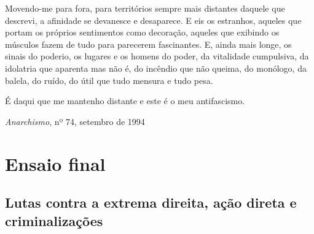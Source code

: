 Movendo-me para fora, para territórios sempre mais distantes daquele que
descrevi, a afinidade se devanesce e desaparece. E eis os estranhos,
aqueles que portam os próprios sentimentos como decoração, aqueles que
exibindo os músculos fazem de tudo para parecerem fascinantes. E, ainda
mais longe, os sinais do poderio, os lugares e os homens do poder, da
vitalidade cumpulsiva, da idolatria que aparenta mas não é, do incêndio
que não queima, do monólogo, da balela, do ruído, do útil que tudo
mensura e tudo pesa.

É daqui que me mantenho distante e este é o meu antifascismo.

\hfill{}\emph{Anarchismo}, nº 74, setembro de 1994


\part{Ensaio final}

\chapter{Lutas contra a extrema direita, ação direta e criminalizações}

\lipsum[5]